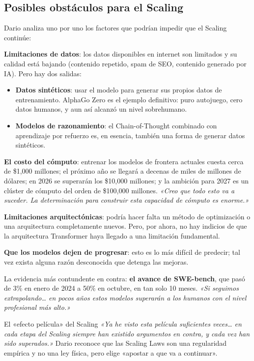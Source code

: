 \subsection{Posibles obstáculos para el Scaling}

Dario analiza uno por uno los factores que podrían impedir que el Scaling continúe:

\textbf{Limitaciones de datos}: los datos disponibles en internet son limitados y su calidad está bajando (contenido repetido, spam de SEO, contenido generado por IA). Pero hay dos salidas:
\begin{itemize}
    \item \textbf{Datos sintéticos}: usar el modelo para generar sus propios datos de entrenamiento. AlphaGo Zero es el ejemplo definitivo: puro autojuego, cero datos humanos, y aun así alcanzó un nivel sobrehumano.
    \item \textbf{Modelos de razonamiento}: el Chain-of-Thought combinado con aprendizaje por refuerzo es, en esencia, también una forma de generar datos sintéticos.
\end{itemize}

\textbf{El costo del cómputo}: entrenar los modelos de frontera actuales cuesta cerca de \$1,000 millones; el próximo año se llegará a decenas de miles de millones de dólares; en 2026 se superarán los \$10,000 millones; y la ambición para 2027 es un clúster de cómputo del orden de \$100,000 millones. \textit{«Creo que todo esto va a suceder. La determinación para construir esta capacidad de cómputo es enorme.»}

\textbf{Limitaciones arquitectónicas}: podría hacer falta un método de optimización o una arquitectura completamente nuevos. Pero, por ahora, no hay indicios de que la arquitectura Transformer haya llegado a una limitación fundamental.

\textbf{Que los modelos dejen de progresar}: esto es lo más difícil de predecir; tal vez exista alguna razón desconocida que detenga las mejoras.

La evidencia más contundente en contra: \textbf{el avance de SWE-bench}, que pasó de 3\% en enero de 2024 a 50\% en octubre, en tan solo 10 meses. \textit{«Si seguimos extrapolando… en pocos años estos modelos superarán a los humanos con el nivel profesional más alto.»}

\begin{importantbox}{El «efecto película» del Scaling}
\textit{«Ya he visto esta película suficientes veces… en cada etapa del Scaling siempre han existido argumentos en contra, y cada vez han sido superados.»} Dario reconoce que las Scaling Laws son una regularidad empírica y no una ley física, pero elige «apostar a que va a continuar».
\end{importantbox}

